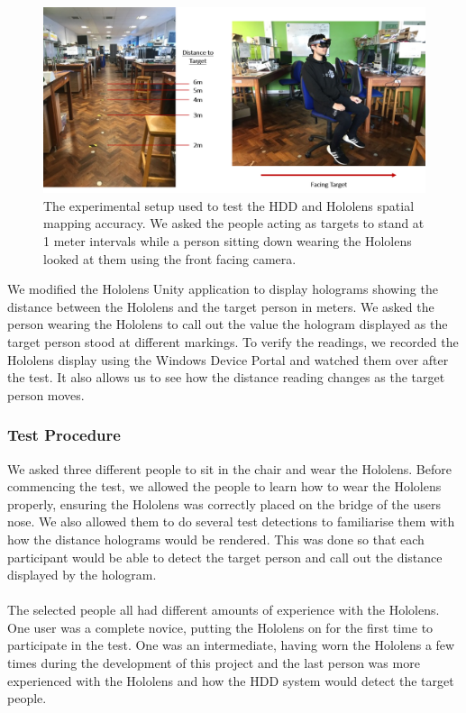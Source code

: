 \begin{figure}[ht]
	\centering
	\includegraphics[width=1.0\linewidth]{img/chapter6_test/hddTestSetup.png}
	\caption{The experimental setup used to test the HDD and Hololens spatial mapping accuracy. We asked the people acting as targets to stand at 1 meter intervals while a person sitting down wearing the Hololens looked at them using the front facing camera.}
	\label{fig:hddTestSetup}
\end{figure}
 
We modified the Hololens Unity application to display holograms showing the distance between the Hololens and the target person in meters. We asked the person wearing the Hololens to call out the value the hologram displayed as the target person stood at different markings. To verify the readings, we recorded the Hololens display using the Windows Device Portal and watched them over after the test. It also allows us to see how the distance reading changes as the target person moves.
 
\subsubsection{Test Procedure}
We asked three different people to sit in the chair and wear the Hololens. Before commencing the test, we allowed the people to learn how to wear the Hololens properly, ensuring the Hololens was correctly placed on the bridge of the users nose. We also allowed them to do several test detections to familiarise them with how the distance holograms would be rendered. This was done so that each participant would be able to detect the target person and call out the distance displayed by the hologram.

\paragraph{} The selected people all had different amounts of experience with the Hololens. One user was a complete novice, putting the Hololens on for the first time to participate in the test. One was an intermediate, having worn the Hololens a few times during the development of this project and the last person was more experienced with the Hololens and how the HDD system would detect the target people.

